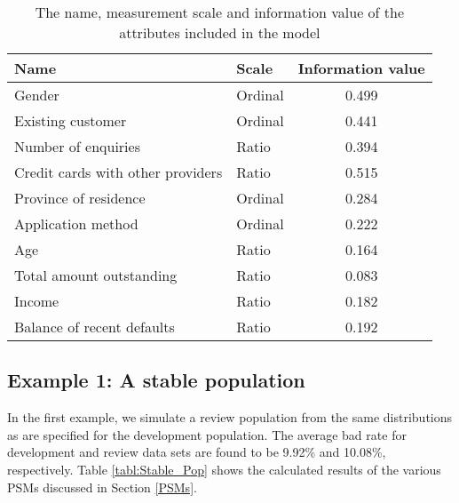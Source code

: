 \documentclass{article}
\theoremstyle{def}
\begin{document}
\begin{table}[!htbp!]%
\caption{The name, measurement scale and information value of the attributes included in the model}
\label{Attributes}
\centering
\small
\begin{tabular}{llc}
\hline
Name & Scale & Information value \\
\hline
Gender & Ordinal & 0.499\\
Existing customer & Ordinal & 0.441\\
Number of enquiries & Ratio  & 0.394\\
Credit cards with other providers & Ratio & 0.515\\
Province of residence & Ordinal & 0.284\\
Application method & Ordinal & 0.222\\
Age & Ratio & 0.164\\
Total amount outstanding & Ratio & 0.083\\
Income & Ratio & 0.182\\
Balance of recent defaults & Ratio & 0.192\\
\hline
\end{tabular}
\end{table}

\subsection{Example 1: A stable population}

In the first example, we simulate a review population from the same distributions as are specified for the development population. The average bad rate for development and review data sets are found to be 9.92\% and 10.08\%, respectively.
Table \ref{tabl:Stable_Pop} shows the calculated results of the various PSMs discussed in Section \ref{PSMs}.
\end{document}

